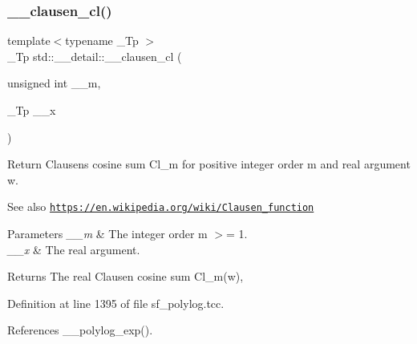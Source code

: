 \mbox{\label{namespacestd_1_1____detail_a523b5171a620d8816339c71994e67bb1}} 
\subsubsection{\texorpdfstring{\+\_\+\+\_\+clausen\+\_\+cl()}{\_\_clausen\_cl()}\hspace{0.1cm}{\footnotesize\ttfamily [2/2]}}
{\footnotesize\ttfamily template$<$typename \+\_\+\+Tp $>$ \\
\+\_\+\+Tp std\+::\+\_\+\+\_\+detail\+::\+\_\+\+\_\+clausen\+\_\+cl (\begin{DoxyParamCaption}\item[{unsigned int}]{\+\_\+\+\_\+m,  }\item[{\+\_\+\+Tp}]{\+\_\+\+\_\+x }\end{DoxyParamCaption})}

Return Clausen\textquotesingle{}s cosine sum Cl\+\_\+m for positive integer order m and real argument w. \begin{DoxySeeAlso}{See also}
\href{https://en.wikipedia.org/wiki/Clausen_function}{\tt https\+://en.\+wikipedia.\+org/wiki/\+Clausen\+\_\+function}
\end{DoxySeeAlso}

\begin{DoxyParams}{Parameters}
{\em \+\_\+\+\_\+m} & The integer order m $>$= 1. \\
\hline
{\em \+\_\+\+\_\+x} & The real argument. \\
\hline
\end{DoxyParams}
\begin{DoxyReturn}{Returns}
The real Clausen cosine sum Cl\+\_\+m(w), 
\end{DoxyReturn}


Definition at line 1395 of file sf\+\_\+polylog.\+tcc.



References \+\_\+\+\_\+polylog\+\_\+exp().

\mbox{\label{namespacestd_1_1____detail_ab7d250f236ef63ed8bd260881b73524d}} 
